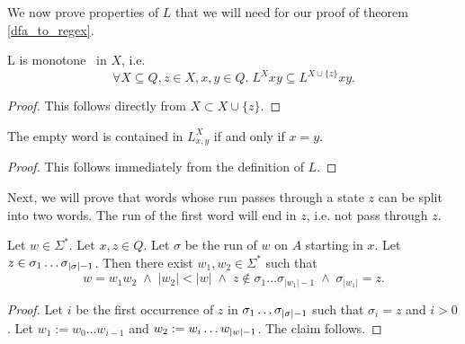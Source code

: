 
We now prove properties of $L$ that we will need for our proof of theorem \ref{dfa_to_regex}.

\begin{lemma}
    \label{L_monotone}
    L is monotone  in $X$, i.e.
    \begin{equation*}
        \forall X \subseteq Q, z \in X, x,y \in Q. \; L^X x y \subseteq L^{X\cup\{z\}} x y.
    \end{equation*}
\end{lemma}
\begin{proof}
    This follows directly from $X \subset X\cup\{z\}$.
\end{proof}


\begin{lemma}
    \label{L_nil}
    The empty word is contained in $L^X_{x,y}$ if and only if $x=y$.
\end{lemma}
\begin{proof}
   This follows immediately from the definition of $L$. 
\end{proof}


Next, we will prove that words whose run passes through a state $z$ can be split into two words. 
The run of the first word will end in $z$, i.e. not pass through $z$.

\begin{lemma}
    \label{run_split}
    Let $w \in \Sigma^*$. Let $x,z \in Q$. 
    Let $\sigma$ be the run of $w$ on $A$ starting in $x$.
    Let $z \in \sigma_1 \ldots {\sigma}_{|{\sigma}|-1}$.
    Then there exist $w_1, w_2 \in \Sigma^*$ such that
    \begin{equation*}
        w = w_1 w_2 \; \wedge \; |w_2| < |w| \; \wedge \; z \notin \sigma_1 \ldots \sigma_{|w_1|-1} \; \wedge \; \sigma_{|w_1|} = z.
    \end{equation*}
\end{lemma}
\begin{proof}
    Let $i$ be the first occurrence of $z$ in $\sigma_1 \dots {\sigma}_{|{\sigma}|-1}$ such that
    $\sigma_i = z$ and $i > 0$.
    Let $w_1 := w_0 \ldots w_{i-1}$ and $w_2 := w_i \ldots {w}_{|{w}|-1}$.
    The claim follows.
\end{proof}

